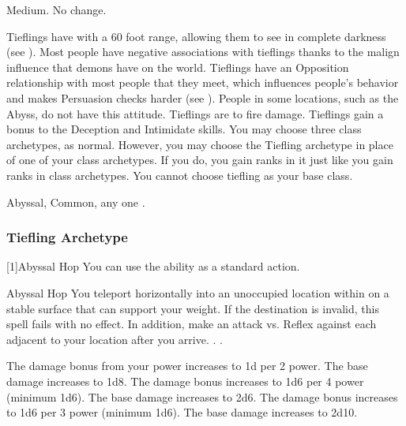          Medium.
         No change.
        \begin{itemize}
             Tieflings have  with a 60 foot range, allowing them to see in complete darkness (see ).
             Most people have negative associations with tieflings thanks to the malign influence that demons have on the world.
                Tieflings have an Opposition relationship with most people that they meet, which influences people's behavior and makes Persuasion checks harder (see ).
                People in some locations, such as the Abyss, do not have this attitude.
             Tieflings are  to fire damage.
             Tieflings gain a  bonus to the Deception and Intimidate skills.
             You may choose three class archetypes, as normal.
                However, you may choose the Tiefling archetype in place of one of your class archetypes.
                If you do, you gain ranks in it just like you gain ranks in class archetypes.
                You cannot choose tiefling as your base class.
        \end{itemize}
         Abyssal, Common, any one .

        \subsubsection{Tiefling Archetype}
            [1]{Abyssal Hop} You can use the  ability as a standard action.
            \begin{magicalactiveability}{Abyssal Hop}
                \rankline
                You teleport horizontally into an unoccupied location within \shortrange on a stable surface that can support your weight.
                If the destination is invalid, this spell fails with no effect.
                In addition, make an attack vs. Reflex against each  adjacent to your location after you arrive.
                \hit {}.
                \miss {}.

                \rankline
                 The damage bonus from your power increases to \plus1d per 2 power.
                 The base damage increases to 1d8.
                 The damage bonus increases to 1d6 per 4 power (minimum 1d6).
                 The base damage increases to 2d6.
                 The damage bonus increases to 1d6 per 3 power (minimum 1d6).
                 The base damage increases to 2d10.
            \end{magicalactiveability}

